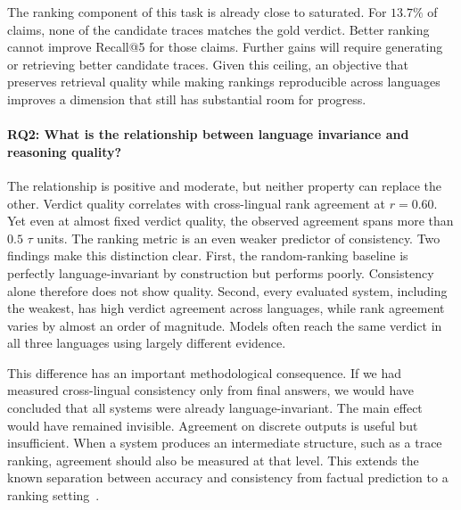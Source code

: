 The ranking component of this task is already close to saturated. For $13.7\%$ of claims, none of the
candidate traces matches the gold verdict. Better ranking cannot improve Recall@5 for those claims.
Further gains will require generating or retrieving better candidate traces. Given this ceiling, an
objective that preserves retrieval quality while making rankings reproducible across languages
improves a dimension that still has substantial room for progress.

\paragraph{RQ2: What is the relationship between language invariance and reasoning quality?}
The relationship is positive and moderate, but neither property can replace the other. Verdict
quality correlates with cross-lingual rank agreement at $r = 0.60$. Yet even at almost fixed verdict
quality, the observed agreement spans more than $0.5$ $\tau$ units. The ranking metric
is an even weaker predictor of consistency. Two findings make this distinction clear. First, the
random-ranking baseline is perfectly
language-invariant by construction but performs poorly. Consistency alone therefore does not show
quality. Second, every evaluated system, including the weakest, has high verdict agreement across
languages, while rank agreement varies by almost an order of magnitude. Models often reach the same
verdict in all three languages using largely different evidence.

This difference has an important methodological consequence. If we had measured cross-lingual
consistency only from final answers, we would have concluded that all systems were already
language-invariant. The main effect would have remained invisible. Agreement on discrete outputs is
useful but insufficient. When a system produces an intermediate structure, such as a trace ranking,
agreement should also be measured at that level. This extends the known separation between accuracy
and consistency from factual prediction to a ranking
setting~\cite{elazar2021measuringimprovingconsistencypretrained,Qi_2023}.

